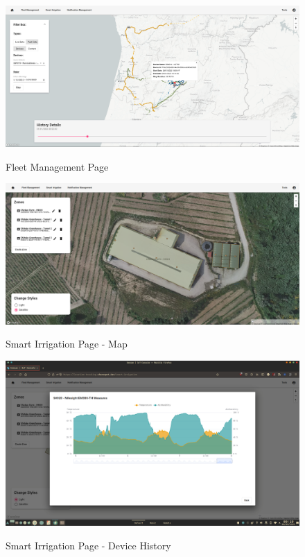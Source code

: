 \begin{figure}[H]
   \centering
   \resizebox{\columnwidth}{!}
   {
      \includegraphics{assets/figures/ui/fleet.png}
   }
   \caption[Fleet Management Page]{Fleet Management Page}
   \label{fig:AppendixD:fleet}
\end{figure}

\begin{figure}[H]
   \centering
   \resizebox{\columnwidth}{!}
   {
      \includegraphics{assets/figures/ui/smart-irrigation-map.png}
   }
   \caption[Smart Irrigation Page - Map]{Smart Irrigation Page - Map}
   \label{fig:AppendixD:irrigmap}
\end{figure}

\begin{figure}[H]
   \centering
   \resizebox{\columnwidth}{!}
   {
      \includegraphics{assets/figures/ui/smart-irrigation-history.png}
   }
   \caption[Smart Irrigation Page - Device History]{Smart Irrigation Page - Device History}
   \label{fig:AppendixD:irrighistory}
\end{figure}
